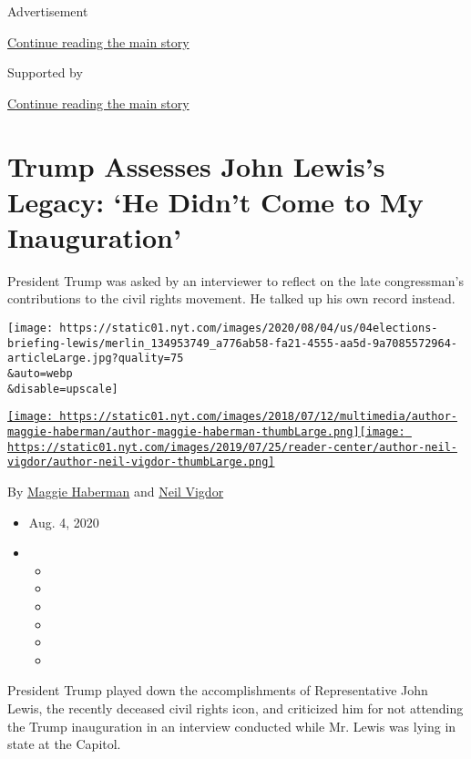 Advertisement

\protect\hyperlink{after-top}{Continue reading the main story}

Supported by

\protect\hyperlink{after-sponsor}{Continue reading the main story}

\hypertarget{trump-assesses-john-lewiss-legacy-he-didnt-come-to-my-inauguration}{%
\section{Trump Assesses John Lewis's Legacy: `He Didn't Come to My
Inauguration'}\label{trump-assesses-john-lewiss-legacy-he-didnt-come-to-my-inauguration}}

President Trump was asked by an interviewer to reflect on the late
congressman's contributions to the civil rights movement. He talked up
his own record instead.

\texttt{[image: https://static01.nyt.com/images/2020/08/04/us/04elections-briefing-lewis/merlin\_134953749\_a776ab58-fa21-4555-aa5d-9a7085572964-articleLarge.jpg?quality=75\\\&auto=webp\\\&disable=upscale]}

\href{https://www.nytimes.com/by/maggie-haberman}{\texttt{[image: https://static01.nyt.com/images/2018/07/12/multimedia/author-maggie-haberman/author-maggie-haberman-thumbLarge.png]}}\href{https://www.nytimes.com/by/neil-vigdor}{\texttt{[image: https://static01.nyt.com/images/2019/07/25/reader-center/author-neil-vigdor/author-neil-vigdor-thumbLarge.png]}}

By \href{https://www.nytimes.com/by/maggie-haberman}{Maggie Haberman}
and \href{https://www.nytimes.com/by/neil-vigdor}{Neil Vigdor}

\begin{itemize}
\item
  Aug. 4, 2020
\item
  \begin{itemize}
  \item
  \item
  \item
  \item
  \item
  \item
  \end{itemize}
\end{itemize}

President Trump played down the accomplishments of Representative John
Lewis, the recently deceased civil rights icon, and criticized him for
not attending the Trump inauguration in an interview conducted while Mr.
Lewis was lying in state at the Capitol.

